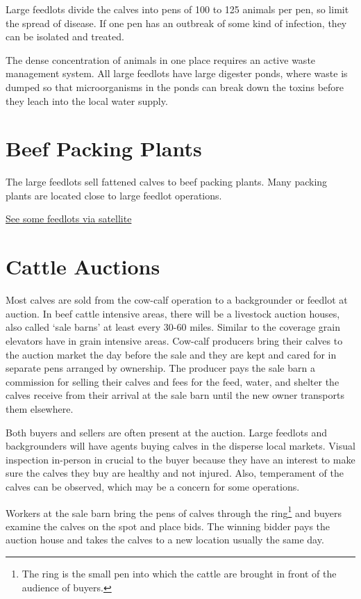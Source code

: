 \documentclass[]{book}
\let\rmarkdownfootnote\footnote%
\def\footnote{\protect\rmarkdownfootnote}
\theoremstyle{definition}
\theoremstyle{definition}
\theoremstyle{remark}
\begin{document}
Large feedlots divide the calves into pens of 100 to 125 animals per
pen, so limit the spread of disease. If one pen has an outbreak of some
kind of infection, they can be isolated and treated.

The dense concentration of animals in one place requires an active waste
management system. All large feedlots have large digester ponds, where
waste is dumped so that microorganisms in the ponds can break down the
toxins before they leach into the local water supply.

\section{Beef Packing Plants}\label{beef-packing-plants}

The large feedlots sell fattened calves to beef packing plants. Many
packing plants are located close to large feedlot operations.

\href{http://maps.google.com}{See some feedlots via satellite}

\section{Cattle Auctions}\label{cattle-auctions}

Most calves are sold from the cow-calf operation to a backgrounder or
feedlot at auction. In beef cattle intensive areas, there will be a
livestock auction houses, also called `sale barns' at least every 30-60
miles. Similar to the coverage grain elevators have in grain intensive
areas. Cow-calf producers bring their calves to the auction market the
day before the sale and they are kept and cared for in separate pens
arranged by ownership. The producer pays the sale barn a commission for
selling their calves and fees for the feed, water, and shelter the
calves receive from their arrival at the sale barn until the new owner
transports them elsewhere.

Both buyers and sellers are often present at the auction. Large feedlots
and backgrounders will have agents buying calves in the disperse local
markets. Visual inspection in-person in crucial to the buyer because
they have an interest to make sure the calves they buy are healthy and
not injured. Also, temperament of the calves can be observed, which may
be a concern for some operations.

Workers at the sale barn bring the pens of calves through the
ring\footnote{The ring is the small pen into which the cattle are
  brought in front of the audience of buyers.} and buyers examine the
calves on the spot and place bids. The winning bidder pays the auction
house and takes the calves to a new location usually the same day.
\end{document}

